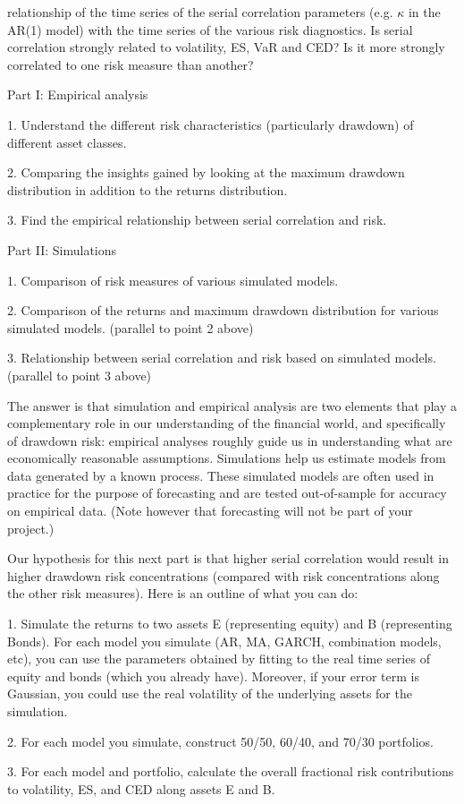 \documentclass[11pt]{article}
\begin{document}
relationship of the time series of the serial correlation parameters (e.g. $\kappa$ in the AR(1) model) with the time series of the various risk diagnostics. Is serial correlation strongly related to volatility, ES, VaR and CED? Is it more strongly correlated to one risk measure than another?



Part I: Empirical analysis

1. Understand the different risk characteristics (particularly drawdown) of different asset classes.

2. Comparing the insights gained by looking at the maximum drawdown distribution in addition to the returns distribution.

3. Find the empirical relationship between serial correlation and risk.


Part II: Simulations

1. Comparison of risk measures of various simulated models.

2. Comparison of the returns and maximum drawdown distribution for various simulated models. (parallel to point 2 above)

3. Relationship between serial correlation and risk based on simulated models. (parallel to point 3 above)


The answer is that simulation and empirical analysis are two elements that play a complementary role in our understanding of the financial world, and specifically of drawdown risk: empirical analyses roughly guide us in understanding what are economically reasonable assumptions. Simulations help us estimate models from data generated by a known process. These simulated models are often used in practice for the purpose of forecasting and are tested out-of-sample for accuracy on empirical data. (Note however that forecasting will not be part of your project.)


Our hypothesis for this next part is that higher serial correlation would result in higher drawdown risk concentrations (compared with risk concentrations along the other risk measures). Here is an outline of what you can do:

1. Simulate the returns to two assets E (representing equity) and B (representing Bonds). For each model you simulate (AR, MA, GARCH, combination models, etc), you can use the parameters obtained by fitting to the real time series of equity and bonds (which you already have). Moreover, if your error term is Gaussian, you could use the real volatility of the underlying assets for the simulation.

2. For each model you simulate, construct 50/50, 60/40, and 70/30 portfolios.

3. For each model and portfolio, calculate the overall fractional risk contributions to volatility, ES, and CED along assets E and B.
\end{document}
